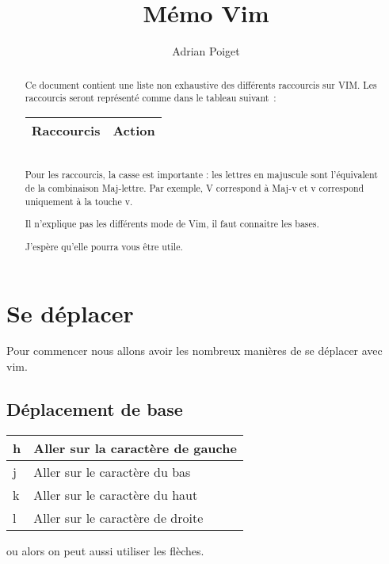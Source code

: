 \documentclass{article}
\title{Mémo Vim}
\author{Adrian Poiget}
\begin{document}
\maketitle
\begin{abstract}
    Ce document contient une liste non exhaustive des différents raccourcis sur VIM.
    Les raccourcis seront représenté comme dans le tableau suivant~:
    \begin{tabular}{|p{3cm}| l| }
        \hline
        Raccourcis & Action\\ \hline
    \end{tabular}\\
    Pour les raccourcis, la casse est importante : les lettres en majuscule sont l'équivalent de la combinaison Maj-lettre. Par exemple, V correspond à Maj-v et v correspond uniquement à la touche v.

    Il n'explique pas les différents mode de Vim, il faut connaitre les bases.

    J'espère qu'elle pourra vous être utile.\\
\end{abstract}

\tableofcontents
\newpage

\section{Se déplacer}
Pour commencer nous allons avoir les nombreux manières de se déplacer avec vim.
\subsection{Déplacement de base}
\begin{tabular}{|p{3cm}| l| }
    \hline
    h & Aller sur la caractère de gauche \\ \hline
    j & Aller sur le caractère du bas \\ \hline
    k & Aller sur le caractère du haut \\ \hline
    l & Aller sur le caractère de droite \\ \hline
\end{tabular}
ou alors on peut aussi utiliser les flèches.
\end{document}
